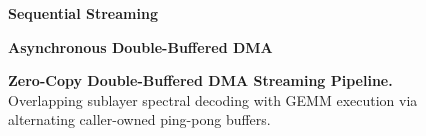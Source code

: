 \documentclass[11pt,a4paper]{article}
\begin{document}
\begin{figure}[t]
    \centering
    \begin{minipage}{0.48\textwidth}
        \centering
        \textbf{Sequential Streaming}\\
        \vspace{0.4em}
    \end{minipage}
    \hfill
    \begin{minipage}{0.48\textwidth}
        \centering
        \textbf{Asynchronous Double-Buffered DMA}\\
        \vspace{0.4em}
    \end{minipage}
    \caption{\textbf{Zero-Copy Double-Buffered DMA Streaming Pipeline.} Overlapping sublayer spectral decoding with GEMM execution via alternating caller-owned ping-pong buffers.}
    \label{fig:dma_pipeline}
\end{figure}
\end{document}
